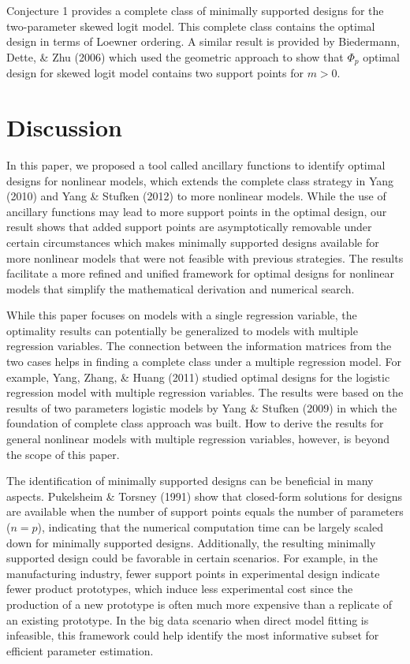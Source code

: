 \documentclass[12pt]{TD-CJS}
\begin{document}
Conjecture 1 provides a complete class of minimally supported designs for the two-parameter skewed logit model. This complete class contains the optimal design in terms of Loewner ordering. A similar result is provided by Biedermann, Dette, \& Zhu (2006) which used the geometric approach to show that $\Phi_p$ optimal design for skewed logit model contains two support points for $m>0$. 



\section{Discussion}\label{dis}
In this paper, we proposed a tool called ancillary functions to identify optimal designs for nonlinear models, which extends the complete class strategy in Yang (2010) and Yang \& Stufken (2012) to more nonlinear models. While the use of ancillary functions may lead to more support points in the optimal design, our result shows that added support points are asymptotically removable under certain circumstances which makes minimally supported designs available for more nonlinear models that were not feasible with previous strategies. The results facilitate a more refined and unified framework for optimal designs for nonlinear models that simplify the mathematical derivation and numerical search.

While this paper focuses on models with a single regression variable, the optimality results can potentially be generalized to models with multiple regression variables. The connection between the information matrices from the two cases helps in finding a complete class under a multiple regression model. For example, Yang, Zhang, \& Huang (2011) studied optimal designs for the logistic regression model with multiple regression variables. The results were based on the results of two parameters logistic models by Yang \& Stufken (2009) in which the foundation of complete class approach was built. How to derive the results for general nonlinear models with multiple regression variables, however, is beyond the scope of this paper.

The identification of minimally supported designs can be beneficial in many aspects. Pukelsheim \& Torsney (1991) show that closed-form solutions for designs are available when the number of support points equals the number of parameters ($n=p$), indicating that the numerical computation time can be largely scaled down for minimally supported designs.  Additionally, the resulting minimally supported design could be favorable in certain scenarios. For example, in the manufacturing industry, fewer support points in experimental design indicate fewer product prototypes, which induce less experimental cost since the production of a new prototype is often much more expensive than a replicate of an existing prototype. In the big data scenario when direct model fitting is infeasible, this framework could help identify the most informative subset for efficient parameter estimation.
\end{document}
